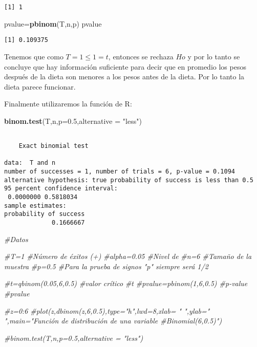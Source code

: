 \documentclass[a4paper,oneside,openany]{book}
\newenvironment{Shaded}{\begin{snugshade}}{\end{snugshade}}
\newcommand{\KeywordTok}[1]{\textcolor[rgb]{0.13,0.29,0.53}{\textbf{#1}}}
\newcommand{\DataTypeTok}[1]{\textcolor[rgb]{0.13,0.29,0.53}{#1}}
\newcommand{\FloatTok}[1]{\textcolor[rgb]{0.00,0.00,0.81}{#1}}
\newcommand{\StringTok}[1]{\textcolor[rgb]{0.31,0.60,0.02}{#1}}
\newcommand{\CommentTok}[1]{\textcolor[rgb]{0.56,0.35,0.01}{\textit{#1}}}
\newcommand{\NormalTok}[1]{#1}
\begin{document}
\begin{verbatim}
[1] 1
\end{verbatim}

\begin{Shaded}
\begin{Highlighting}[]
\NormalTok{pvalue=}\KeywordTok{pbinom}\NormalTok{(T,n,p)}
\NormalTok{pvalue}
\end{Highlighting}
\end{Shaded}

\begin{verbatim}
[1] 0.109375
\end{verbatim}

Tenemos que como \(T=1\leq 1 =t\), entonces se rechaza \(Ho\) y por lo
tanto se concluye que hay información suficiente para decir que en
promedio los pesos después de la dieta son menores a los pesos antes de
la dieta. Por lo tanto la dieta parece funcionar.

Finalmente utilizaremos la función de R:

\begin{Shaded}
\begin{Highlighting}[]
\KeywordTok{binom.test}\NormalTok{(T,n,}\DataTypeTok{p=}\FloatTok{0.5}\NormalTok{,}\DataTypeTok{alternative =} \StringTok{"less"}\NormalTok{)}
\end{Highlighting}
\end{Shaded}

\begin{verbatim}

    Exact binomial test

data:  T and n
number of successes = 1, number of trials = 6, p-value = 0.1094
alternative hypothesis: true probability of success is less than 0.5
95 percent confidence interval:
 0.0000000 0.5818034
sample estimates:
probability of success 
             0.1666667 
\end{verbatim}

\begin{Shaded}
\begin{Highlighting}[]
\CommentTok{#Datos}

\CommentTok{#T=1              #Número de éxitos (+)}
\CommentTok{#alpha=0.05       #Nivel de }
\CommentTok{#n=6              #Tamaño de la muestra }
\CommentTok{#p=0.5            #Para la prueba de signos "p" siempre será 1/2}


\CommentTok{#t=qbinom(0.05,6,0.5)           #valor crítico}
\CommentTok{#t}
\CommentTok{#pvalue=pbinom(1,6,0.5)         #p-value      }
\CommentTok{#pvalue}

\CommentTok{#z=0:6}
\CommentTok{#plot(z,dbinom(z,6,0.5),type="h",lwd=8,xlab= " ",ylab=" ",main="Función de distribución de una variable #Binomial(6,0.5)")}


\CommentTok{#binom.test(T,n,p=0.5,alternative = "less")}
\end{Highlighting}
\end{Shaded}
\end{document}
